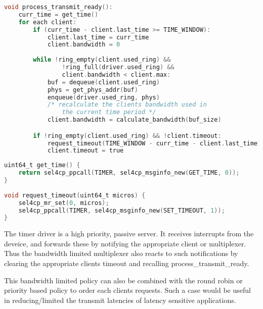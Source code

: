 \begin{minipage}{\textwidth}
    \centering
    \begin{lstlisting}[tabsize=2, language=C, caption={Transmit Bandwidth Limited Policy},frame=tb, 
                        label={l:bandwidth}, captionpos=b]
void process_transmit_ready():
    curr_time = get_time()
    for each client:
        if (curr_time - client.last_time >= TIME_WINDOW):
            client.last_time = curr_time
            client.bandwidth = 0
        
        while !ring_empty(client.used_ring) && 
                !ring_full(driver.used_ring) && 
                client.bandwidth < client.max:
            buf = dequeue(client.used_ring)
            phys = get_phys_addr(buf)
            enqueue(driver.used_ring, phys)
            /* recalculate the clients bandwidth used in 
                the current time period */ 
            client.bandwidth = calculate_bandwidth(buf_size)

        if !ring_empty(client.used_ring) && !client.timeout:
            request_timeout(TIME_WINDOW - curr_time - client.last_time)
            client.timeout = true
    \end{lstlisting}
\end{minipage}

\begin{minipage}{\textwidth}
    \centering
    \begin{lstlisting}[tabsize=2, language=C, caption={Timer Driver API},frame=tb, 
                        label={l:timer}, captionpos=b]
uint64_t get_time() {
    return sel4cp_ppcall(TIMER, sel4cp_msginfo_new(GET_TIME, 0));
}
        
void request_timeout(uint64_t micros) {
    sel4cp_mr_set(0, micros);
    sel4cp_ppcall(TIMER, sel4cp_msginfo_new(SET_TIMEOUT, 1));
}
    \end{lstlisting}
\end{minipage}

The timer driver is a high priority, passive server. It receives interrupts from the deveice,
and forwards these by notifying the appropriate client or multiplexer. Thus the bandwidth limited
multiplexer also reacts to such notifications by clearing the appropriate clients timeout and
recalling process\_transmit\_ready.

This bandwidth limited policy can also be combined with the round robin or priority based policy
to order each clients requests. Such a case would be useful in reducing/limited the 
transmit latencies of latency sensitive applications.\\ 

